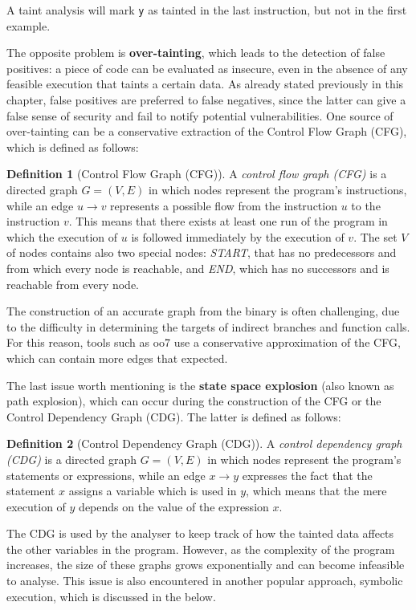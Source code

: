 \documentclass[12pt,a4paper]{book}
\theoremstyle{definition}
\newtheorem{defn}{Definition}
\begin{document}
	A taint analysis will mark \texttt{y} as tainted in the last instruction, but not in the first example.
	
	The opposite problem is \textbf{over-tainting}, which leads to the detection of false positives: a piece of code can be evaluated as insecure, even in the absence of any feasible execution that taints a certain data. As already stated previously in this chapter, false positives are preferred to false negatives, since the latter can give a false sense of security and fail to notify potential vulnerabilities. One source of over-tainting can be a conservative extraction of the Control Flow Graph (CFG), which is defined as follows:
	\begin{defn}[Control Flow Graph (CFG)]
		A \textit{control flow graph (CFG)} is a directed graph $G=(V,E)$ in which nodes represent the program's instructions, while an edge $u \rightarrow v$ represents a possible flow from the instruction $u$ to the instruction $v$. This means that there exists at least one run of the program in which the execution of $u$ is followed immediately by the execution of $v$. The set $V$ of nodes contains also two special nodes: \textit{START}, that has no predecessors and from which every node is reachable, and \textit{END}, which has no successors and is reachable from every node.
	\end{defn}
	
	The construction of an accurate graph from the binary is often challenging, due to the difficulty in determining the targets of indirect branches and function calls. For this reason, tools such as oo7 \cite{Wang2019} use a conservative approximation of the CFG, which can contain more edges that expected.
	
	The last issue worth mentioning is the \textbf{state space explosion} (also known as path explosion), which can occur during the construction of the CFG or the Control Dependency Graph (CDG). The latter is defined as follows:
	
	\begin{defn}[Control Dependency Graph (CDG)]
		A \textit{control dependency graph (CDG)} \cite{Krinke2007} is a directed graph $G=(V,E)$ in which nodes represent the program's statements or expressions, while an edge $x\rightarrow y$ expresses the fact that the statement $x$ assigns a variable which is used in $y$, which means that the mere execution of $y$ depends on the value of the expression $x$. 
	\end{defn}
	The CDG is used by the analyser to keep track of how the tainted data affects the other variables in the program. However, as the complexity of the program increases, the size of these graphs grows exponentially and can become infeasible to analyse. This issue is also encountered in another popular approach, symbolic execution, which is discussed in the below. 
\end{document}
